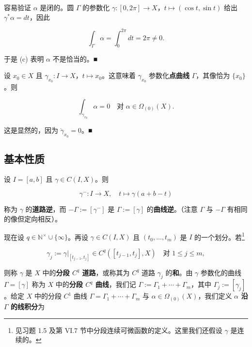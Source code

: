 \begin{example}
\begin{items}
容易验证 $ \alpha $ 是闭的。圆 $ \Gamma $ 的参数化 $ \gamma : [0, 2\pi]\to X $，$ t\mapsto(\cos t, \sin t) $ 给出 $ \gamma^{*}\alpha=dt $，因此

\[
\int_{\Gamma}\alpha=\int_0^{2\pi}dt=2\pi\ne 0 .
\]

于是 (c) 表明 $ \alpha $ 不是恰当的。\nobreak\hspace{0.35em}■

\item

设 $ x_0 \in X $ 且 $ \gamma_{x_0} : I\to X $，$ t\mapsto x_0 $。这意味着 $ \gamma_{x_0} $ 参数化\textbf{点曲线} $ \Gamma $，其像恰为 $ \{x_0\} $。则

\[
\int_{\gamma_{x_0}}\alpha=0\quad\text{对 }\alpha\in\Omega_{(0)}(X) .
\]

\proofhead
这是显然的，因为 $ \dot{\gamma}_{x_0}=0 $。\nobreak\hspace{0.35em}■
\end{items}

\end{example}

\subsection*{基本性质}

设 $ I = [a, b] $ 且 $ \gamma \in C(I, X) $。则

\[
\gamma^{-}:I\to X ,\quad t\mapsto\gamma(a+b-t)
\]

称为 $ \gamma $ 的\textbf{道路逆}，而 $ -\Gamma:=[\gamma^{-}] $ 是 $ \Gamma:=[\gamma] $ 的\textbf{曲线逆}。（注意 $ \Gamma $ 与 $ -\Gamma $ 有相同的像但定向相反）。


现在设 $ q \in \mathbb{N}^{\times}\cup\{\infty\} $。再设 $ \gamma \in C(I, X) $ 且 $ (t_0,\ldots,t_m) $ 是 $ I $ 的一个划分。若\footnote{见习题 1.5 及第 VI.7 节中分段连续可微函数的定义。这里我们还假设 $ \gamma $ 是连续的。}

\[
\gamma_j:=\gamma|_{[t_{j-1},t_j]}\in C^{q}\left([t_{j-1},t_j], X\right)\quad\text{对 }1\le j\le m ,
\]

则称 $ \gamma $ 是 $ X $ 中的\textbf{分段 $ C^{q} $ 道路}，或称其为 $ C^{q} $ 道路 $ \gamma_j $ 的\textbf{和}。由 $ \gamma $ 参数化的曲线 $ \Gamma=[\gamma] $ 称为 $ X $ 中的\textbf{分段 $ C^{q} $ 曲线}，我们记 $ \Gamma:=\Gamma_1+\cdots+\Gamma_m $，其中 $ \Gamma_j:=[\gamma_j] $。给定 $ X $ 中的分段 $ C^1 $ 曲线 $ \Gamma=\Gamma_1+\cdots+\Gamma_m $ 与 $ \alpha \in \Omega_{(0)}(X) $，我们定义 \textbf{$ \alpha $ 沿 $ \Gamma $ 的线积分}为

